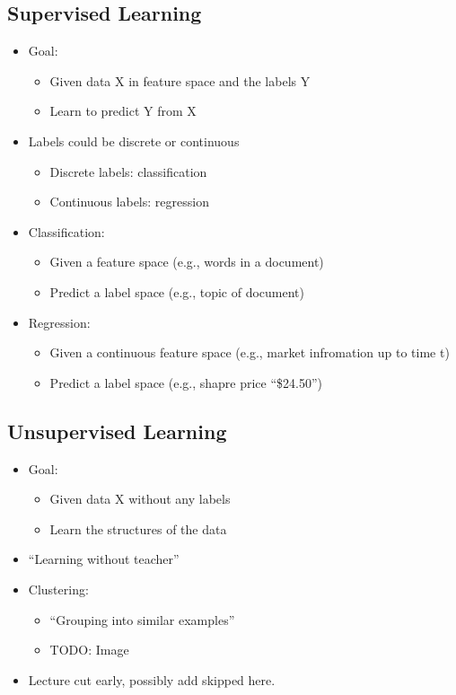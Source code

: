 \subsection{Supervised Learning}
\begin{itemize}
	\item Goal:
	\begin{itemize}
		\item Given data X in feature space and the labels Y
		\item Learn to predict Y from X
	\end{itemize}
	\item Labels could be discrete or continuous
	\begin{itemize}
		\item Discrete labels: classification
		\item Continuous labels: regression
	\end{itemize}
	\item Classification:
	\begin{itemize}
		\item Given a feature space (e.g., words in a document)
		\item Predict a label space (e.g., topic of document)
	\end{itemize}
	\item Regression: 
	\begin{itemize}
		\item Given a continuous feature space (e.g., market infromation up to time t)
		\item Predict a label space (e.g., shapre price ``\$24.50'')
	\end{itemize}
\end{itemize}

\subsection{Unsupervised Learning}
\begin{itemize}
	\item Goal:
	\begin{itemize}
		\item Given data X without any labels
		\item Learn the structures of the data
	\end{itemize}
	\item ``Learning without teacher''
	\item Clustering:
	\begin{itemize}
		\item ``Grouping into similar examples''
		\item TODO: Image
	\end{itemize}
	\item Lecture cut early, possibly add skipped here.
\end{itemize}


